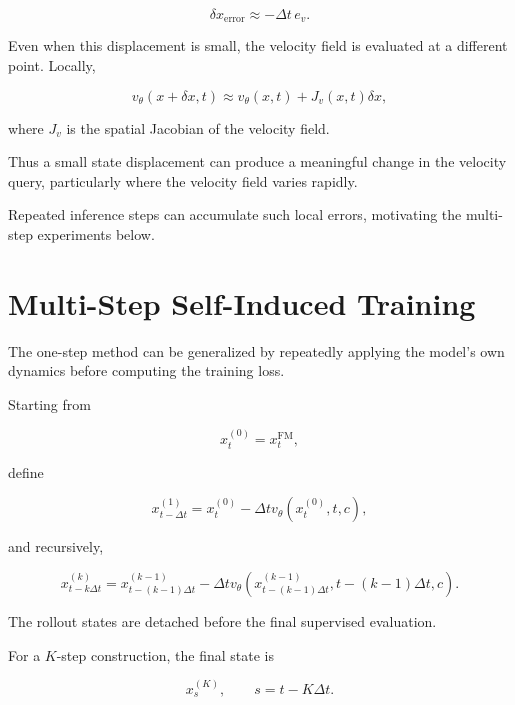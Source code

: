 \documentclass[11pt]{article}
\begin{document}
\begin{equation}
\delta x_{\mathrm{error}}
\approx
-\Delta t\,e_v.
\end{equation}

Even when this displacement is small, the velocity field is evaluated at a
different point. Locally,

\begin{equation}
v_\theta(x+\delta x,t)
\approx
v_\theta(x,t)
+
J_v(x,t)\delta x,
\end{equation}

where $J_v$ is the spatial Jacobian of the velocity field.

Thus a small state displacement can produce a meaningful change in the
velocity query, particularly where the velocity field varies rapidly.

Repeated inference steps can accumulate such local errors, motivating the
multi-step experiments below.

\section{Multi-Step Self-Induced Training}

The one-step method can be generalized by repeatedly applying the model's own
dynamics before computing the training loss.

Starting from

\begin{equation}
x_t^{(0)}
=
x_t^{\mathrm{FM}},
\end{equation}

define

\begin{equation}
x_{t-\Delta t}^{(1)}
=
x_t^{(0)}
-
\Delta t
v_\theta(x_t^{(0)},t,c),
\end{equation}

and recursively,

\begin{equation}
x_{t-k\Delta t}^{(k)}
=
x_{t-(k-1)\Delta t}^{(k-1)}
-
\Delta t
v_\theta
\left(
x_{t-(k-1)\Delta t}^{(k-1)},
t-(k-1)\Delta t,
c
\right).
\end{equation}

The rollout states are detached before the final supervised evaluation.

For a $K$-step construction, the final state is

\begin{equation}
x_s^{(K)},
\qquad
s=t-K\Delta t.
\end{equation}
\end{document}
